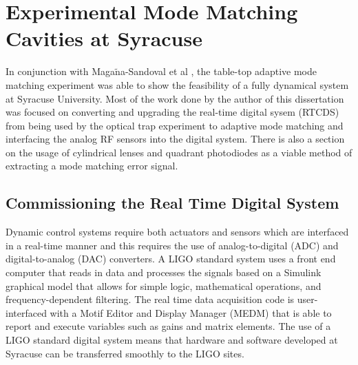 \chapter{Experimental Mode Matching Cavities at Syracuse}
In conjunction with Maga$\tilde{\text{n}}$a-Sandoval et al \cite{Fabian_Thesis}, the table-top adaptive mode matching experiment was able to show the feasibility of a fully dynamical system at Syracuse University.  Most of the work done by the author of this dissertation was focused on converting and upgrading the real-time digital sysem (RTCDS) from being used by the optical trap experiment \cite{OpticalTrap} to adaptive mode matching and interfacing the analog RF sensors into the digital system.  There is also a section on the usage of cylindrical lenses and quadrant photodiodes as a viable method of extracting a mode matching error signal.

\section{Commissioning the Real Time Digital System}
	Dynamic control systems require both actuators and sensors which are interfaced in a real-time manner and this requires the use of analog-to-digital (ADC) and digital-to-analog (DAC) converters.  A LIGO standard system uses a front end computer that reads in data and processes the signals based on a Simulink graphical model that allows for simple logic, mathematical operations, and frequency-dependent filtering.  The real time data acquisition code is user-interfaced with a Motif Editor and Display Manager (MEDM) that is able to report and execute variables such as gains and matrix elements.  The use of a LIGO standard digital system means that hardware and software developed at Syracuse can be transferred smoothly to the LIGO sites.
	
